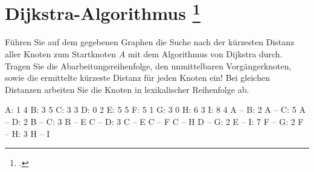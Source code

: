 \documentclass{bschlangaul-aufgabe}
\begin{document}

\section{Dijkstra-Algorithmus
\footcite[Aufgabe 4]{aud:e-klausur}
}

Führen Sie auf dem gegebenen Graphen die Suche nach der kürzesten
Distanz aller Knoten zum Startknoten $A$ mit dem Algorithmus von
Dijkstra durch. Tragen Sie die Abarbeitungsreihenfolge, den
unmittelbaren Vorgängerknoten, sowie die ermittelte kürzeste Distanz für
jeden Knoten ein! Bei gleichen Distanzen arbeiten Sie die Knoten in
lexikalischer Reihenfolge ab.

\begin{liGraphenFormat}
A: 1 4
B: 3 5
C: 3 3
D: 0 2
E: 5 5
F: 5 1
G: 3 0
H: 6 3
I: 8 4
A -- B: 2
A -- C: 5
A -- D: 2
B -- C: 3
B -- E
C -- D: 3
C -- E
C -- F
C -- H
D -- G: 2
E -- I: 7
F -- G: 2
F -- H: 3
H -- I
\end{liGraphenFormat}

\begin{center}
\end{center}
\end{document}
